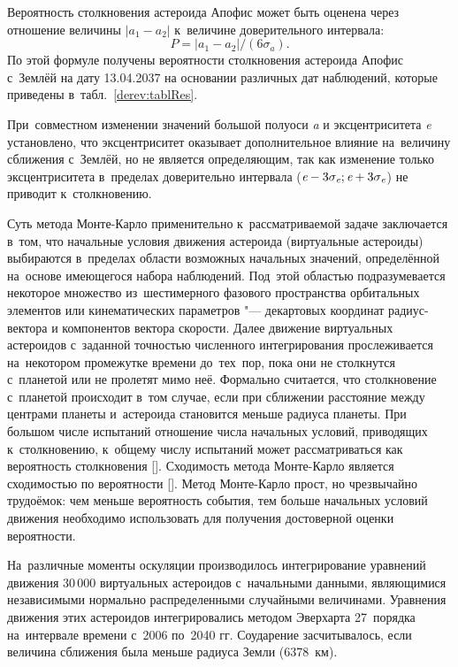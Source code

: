 Вероятность столкновения астероида Апофис может быть оценена через отношение  величины $\left|a_{1}-a_{2}\right|$ к~величине доверительного интервала:
$$
	P=|a_{1}-a_{2}|/(6\sigma_{a}).
$$
По этой формуле получены вероятности столкновения астероида Апофис с~Землёй  на дату 13.04.2037 на основании различных дат наблюдений, которые приведены  в~табл.~\ref{derev:tablRes}.

При~совместном изменении значений большой полуоси \emph{a} и эксцентриситета \emph{e}  установлено, что эксцентриситет оказывает дополнительное влияние 
на~величину сближения с~Землёй, но не является определяющим, так как изменение только эксцентриситета
 в~пределах доверительно интервала ($\emph{e}-3\sigma_{\emph{e}};\emph{e}+3\sigma_{\emph{e}}$) 
не приводит к~столкновению.

Суть метода Монте-Карло применительно к~рассматриваемой задаче заключается в~том, что начальные условия движения астероида (виртуальные астероиды) выбираются  в~пределах области возможных начальных значений, определённой на~основе имеющегося набора наблюдений. 
Под~этой областью подразумевается некоторое множество  из~шестимерного фазового пространства орбитальных элементов или 
кинематических параметров "--- декартовых координат радиус-вектора и компонентов вектора скорости. 
Далее движение виртуальных астероидов  с~заданной точностью численного интегрирования прослеживается на~некотором промежутке 
времени до~тех~пор, пока они не столкнутся с~планетой или не пролетят мимо неё. 
Формально считается, что столкновение с~планетой происходит в~том случае, если при сближении расстояние между центрами планеты и~астероида становится меньше  радиуса планеты. 
При большом числе испытаний отношение числа начальных условий, приводящих к~столкновению, к~общему числу испытаний может рассматриваться как  вероятность столкновения []. 
Сходимость метода Монте-Карло является сходимостью по вероятности []. 
Метод Монте-Карло  прост, но чрезвычайно трудоёмок: чем меньше вероятность  события, тем больше начальных условий движения необходимо использовать для  получения достоверной оценки вероятности.

На~различные моменты оскуляции производилось интегрирование уравнений движения 30\,000 виртуальных астероидов с~начальными данными, являющимися независимыми нормально распределенными случайными величинами. 
Уравнения движения этих астероидов интегрировались методом Эверхарта 27~порядка 
на~интервале времени с~2006 по~2040 гг. 
Соударение засчитывалось, если величина сближения была меньше радиуса Земли (6378~км).

